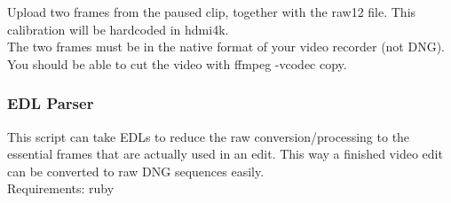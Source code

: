 Upload two frames from the paused clip, together with the raw12 file. This calibration will be hardcoded in hdmi4k.\\

The two frames must be in the native format of your video recorder (not DNG). You should be able to cut the video with ffmpeg -vcodec copy. 

	
\subsubsection{EDL Parser}

This script can take EDLs to reduce the raw conversion/processing to the essential frames that are actually used in an edit. This way a finished video edit can be converted to raw DNG sequences easily.\\

Requirements: ruby \\

